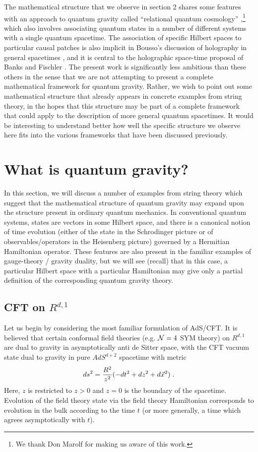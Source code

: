 \documentclass[12pt,epsf]{article}
\newcommand{\be}{\begin{equation}}
\newcommand{\ee}{\end{equation}}
\renewcommand{\(}{\left(}
\renewcommand{\)}{\right)}
\begin{document}
The mathematical structure that we observe in section 2 shares some features with an approach to quantum gravity called ``relational quantum cosmology'' \cite{rqc},\footnote{We thank Don Marolf for making us aware of this work.} which also involves associating quantum states in a number of different systems with a single quantum spacetime. The association of specific Hilbert spaces to particular causal patches is also implicit in Bousso's discussion of holography in general spacetimes \cite{bousso1, bousso2}, and it is central to the holographic space-time proposal of Banks and Fischler \cite{bf}. The present work is significantly less ambitious than these others in the sense that we are not attempting to present a complete mathematical framework for quantum gravity. Rather, we wish to point out some mathematical structure that already appears in concrete examples from string theory, in the hopes that this structure may be part of a complete framework that could apply to the description of more general quantum spacetimes. It would be interesting to understand better how well the specific structure we observe here fits into the various frameworks that have been discussed previously.

\section{What is quantum gravity?}

In this section, we will discuss a number of examples from string theory which suggest that the mathematical structure of quantum gravity may expand upon the structure present in ordinary quantum mechanics. In conventional quantum systems, states are vectors in some Hilbert space, and there is a canonical notion of time evolution (either of the state in the Schrodinger picture or of observables/operators in the Heisenberg picture) governed by a Hermitian Hamiltonian operator. These features are also present in the familiar examples of gauge-theory / gravity duality, but we will see (recall) that in this case, a particular Hilbert space with a particular Hamiltonian may give only a partial definition of the corresponding quantum gravity theory.

\subsection{CFT on $R^{d,1}$}

Let us begin by considering the most familiar formulation of AdS/CFT. It is believed that certain conformal field theories (e.g. ${\cal N}=4$ SYM theory) on $R^{d,1}$ are dual to gravity in asymptotically anti de Sitter space, with the CFT vacuum state dual to gravity in pure $AdS^{d+2}$ spacetime with metric
\be
\label{Poincare}
ds^2 = {R^2 \over z^2} (-dt^2 + dz^2 + d\vec{x}^2) \; .
\ee
Here, $z$ is restricted to $z>0$ and $z=0$ is the boundary of the spacetime. Evolution of the field theory state via the field theory Hamiltonian corresponds to evolution in the bulk according to the time $t$ (or more generally, a time which agrees asymptotically with $t$).
\end{document}
